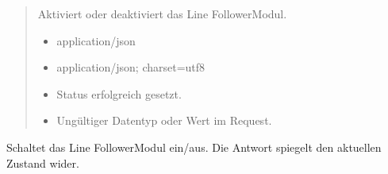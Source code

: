 \documentclass[letterpaper,10pt,english]{sphinxmanual}
\begin{document}
\begin{fulllineitems}
\label{\detokenize{agv_rest_api_linefollower:post--api-agv-linefollower-enable}}
\pysigstartsignatures
\pysigline
{}
\pysigstopsignatures\begin{quote}\begin{description}
\sphinxAtStartPar
Aktiviert oder deaktiviert das Line Follower\sphinxhyphen{}Modul.

\begin{itemize}
\item {} 
\sphinxAtStartPar
{} \textendash{} application/json

\end{itemize}

\begin{itemize}
\item {} 
\sphinxAtStartPar
{} \textendash{} application/json; charset=utf\sphinxhyphen{}8

\end{itemize}

\begin{itemize}
\item {} 
\sphinxAtStartPar
{} \textendash{} Status erfolgreich gesetzt.

\item {} 
\sphinxAtStartPar
{} \textendash{} Ungültiger Datentyp oder Wert im Request.

\end{itemize}

\end{description}\end{quote}

\end{fulllineitems}


\sphinxAtStartPar
{} Schaltet das Line Follower\sphinxhyphen{}Modul ein/aus. Die Antwort spiegelt den aktuellen Zustand wider.

\begin{sphinxVerbatim}[commandchars=\\\{\}]
\end{sphinxVerbatim}
\end{document}
